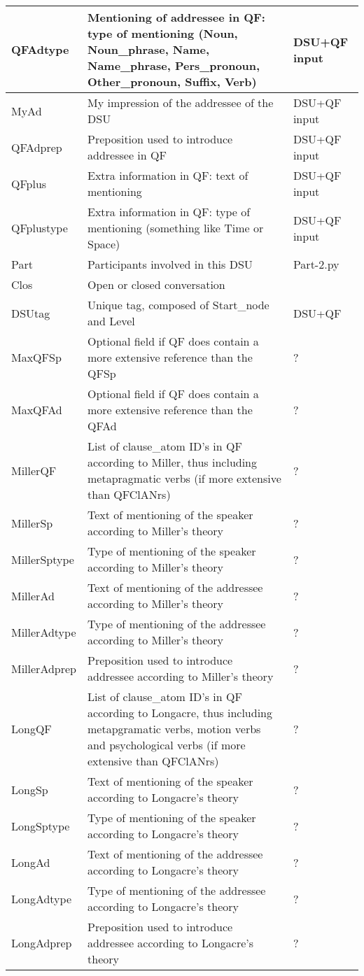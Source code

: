 \documentclass{article}
\begin{document}
\begin{longtable}{|l|p{}|l|}
QFAdtype    & Mentioning of addressee in QF: type of mentioning (Noun, Noun\_phrase, Name, Name\_phrase, Pers\_pronoun, Other\_pronoun, Suffix, Verb) & DSU+QF input \\ \hline
MyAd        & My impression of the addressee of the DSU & DSU+QF input \\ \hline
QFAdprep    & Preposition used to introduce addressee in QF & DSU+QF input \\ \hline
QFplus      & Extra information in QF: text of mentioning & DSU+QF input \\ \hline
QFplustype  & Extra information in QF: type of mentioning (something like Time or Space) & DSU+QF input \\ \hline
Part        & Participants involved in this DSU & Part-2.py \\ \hline
Clos        & Open or closed conversation & \\ \hline
DSUtag      & Unique tag, composed of Start\_node and Level & DSU+QF \\ \hline
MaxQFSp     & Optional field if QF does contain a more extensive reference than the QFSp & ?\\ \hline
MaxQFAd     & Optional field if QF does contain a more extensive reference than the QFAd & ? \\ \hline
MillerQF    & List of clause\_atom ID's in QF according to Miller, thus including metapragmatic verbs (if more extensive than QFClANrs) & ?\\ \hline
MillerSp    & Text of mentioning of the speaker according to Miller's theory & ? \\ \hline
MillerSptype & Type of mentioning of the speaker according to Miller's theory & ? \\ \hline
MillerAd    & Text of mentioning of the addressee according to Miller's theory & ? \\ \hline
MillerAdtype & Type of mentioning of the addressee according to Miller's theory & ? \\ \hline
MillerAdprep & Preposition used to introduce addressee according to Miller's theory & ? \\ \hline
LongQF      & List of clause\_atom ID's in QF according to Longacre, thus including metapgramatic verbs, motion verbs and psychological verbs (if more extensive than QFClANrs) & ? \\
LongSp      & Text of mentioning of the speaker according to Longacre's theory & ? \\ \hline
LongSptype  & Type of mentioning of the speaker according to Longacre's theory & ? \\ \hline
LongAd      & Text of mentioning of the addressee according to Longacre's theory & ? \\ \hline
LongAdtype  & Type of mentioning of the addressee according to Longacre's theory & ? \\ \hline
LongAdprep  & Preposition used to introduce addressee according to Longacre's theory & ? \\ \hline

\end{longtable}
\end{document}
